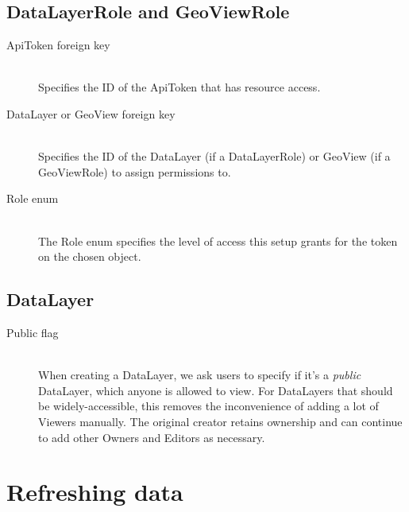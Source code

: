 \subsection{DataLayerRole and GeoViewRole}
\begin{description}
\item[ApiToken foreign key] \hfill \\
Specifies the ID of the ApiToken that has resource access.

\item[DataLayer or GeoView foreign key] \hfill \\
Specifies the ID of the DataLayer (if a DataLayerRole) or GeoView (if a GeoViewRole) to assign permissions to.

\item[Role enum] \hfill \\
The Role enum specifies the level of access this setup grants for the token on the chosen object.
\end{description}


\subsection{DataLayer}
\begin{description}
\item[Public flag] \hfill \\
When creating a DataLayer, we ask users to specify if it's a \textit{public} DataLayer, which anyone is allowed to view. For DataLayers that should be widely-accessible, this removes the inconvenience of adding a lot of Viewers manually. The original creator retains ownership and can continue to add other Owners and Editors as necessary.
\end{description}


\label{design_srid}

\section{Refreshing data}